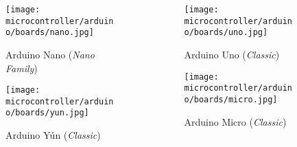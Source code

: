 \begin{frame}
    \begin{columns}
        \begin{column}{0.5\textwidth}
            \begin{figure}
                \texttt{[image: microcontroller/arduino/boards/nano.jpg]}
                \caption{Arduino\textregistered{} Nano (\textit{Nano Family})}
            \end{figure}
            \begin{figure}
                \texttt{[image: microcontroller/arduino/boards/yun.jpg]}
                \caption{Arduino\textregistered{} Yún (\textit{Classic})}
            \end{figure}
        \end{column}
        \begin{column}{0.5\textwidth}
            \begin{figure}
                \texttt{[image: microcontroller/arduino/boards/uno.jpg]}
                \caption{Arduino\textregistered{} Uno (\textit{Classic})}
            \end{figure}
            \begin{figure}
                \texttt{[image: microcontroller/arduino/boards/micro.jpg]}
                \caption{Arduino\textregistered{} Micro (\textit{Classic})}
            \end{figure}
        \end{column}
    \end{columns}
\end{frame}

